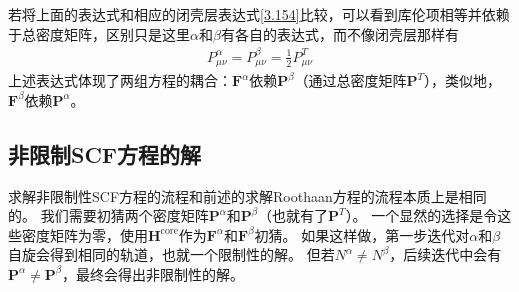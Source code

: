 若将上面的表达式和相应的闭壳层表达式\autoref{3.154}比较，可以看到库伦项相等并依赖于总密度矩阵，区别只是这里$\alpha$和$\beta$有各自的表达式，而不像闭壳层那样有
\begin{align}
	P^\alpha_{\mu\nu}=P^\beta_{\mu\nu}=\frac{1}{2}P^T_{\mu\nu}
\end{align}
上述表达式体现了两组方程的耦合：$\mathbf{F}^\alpha$依赖$\mathbf{P}^\beta$（通过总密度矩阵$\mathbf{P}^T$），类似地，$\mathbf{F}^\beta$依赖$\mathbf{P}^\alpha$。
\subsection{非限制SCF方程的解}
求解非限制性SCF方程的流程和前述的求解Roothaan方程的流程本质上是相同的。
我们需要初猜两个密度矩阵$\mathbf{P}^\alpha$和$\mathbf{P}^\beta$（也就有了$\mathbf{P}^T$）。
一个显然的选择是令这些密度矩阵为零，使用$\mathbf{H}^\text{core}$作为$\mathbf{F}^\alpha$和$\mathbf{F}^\beta$初猜。
如果这样做，第一步迭代对$\alpha$和$\beta$自旋会得到相同的轨道，也就一个限制性的解。
但若$N^\alpha\neq N^\beta$，后续迭代中会有$\mathbf{P}^\alpha\neq\mathbf{P}^\beta$，最终会得出非限制性的解。

